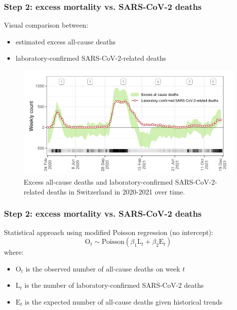 \documentclass[10pt]{beamer}
\begin{document}
\begin{frame}
\frametitle{Step 2: excess mortality vs. SARS-CoV-2 deaths}
\alert{Visual comparison} between:
\begin{itemize}
	\item estimated excess all-cause deaths
	\item laboratory-confirmed SARS-CoV-2-related deaths
\end{itemize}
\begin{figure}[t]
		\includegraphics[width=0.9\linewidth ]{visual_comp_fig.png}
	\caption{Excess all-cause deaths and laboratory-confirmed SARS-CoV-2-related deaths in Switzerland in 2020-2021 over time.}
	
\end{figure}
\end{frame}


\begin{frame}
\frametitle{Step 2: excess mortality vs. SARS-CoV-2 deaths}
\alert{Statistical approach} using modified Poisson regression (no intercept):
$$\text{O}_{t} \sim \text{Poisson}\left( \beta_1\text{L}_{t} + \beta_2\text{E}_{t} \right)$$
where:
\begin{itemize}
\item $\text{O}_{t}$ is the observed number of all-cause deaths on week $t$
\item $\text{L}_{t}$ is the number of laboratory-confirmed SARS-CoV-2 deaths
\item $\text{E}_{t}$ is the expected number of all-cause deaths given historical trends
\end{itemize}
\end{frame}
\end{document}
